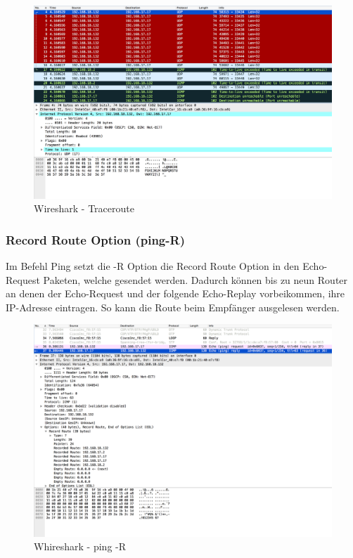 \begin{figure}[htb]
	\centering
  	\includegraphics[scale = 0.27]{pic/tracerouteKnoten}	
  	\caption{Wireshark - Traceroute}
	\label{fig1}
\end{figure}
\newpage
\subsubsection{Record Route Option (ping-R)}
Im Befehl Ping setzt die -R Option die Record Route Option in den Echo-Request Paketen, welche gesendet werden. Dadurch können bis zu neun Router an denen der Echo-Request und der folgende Echo-Replay vorbeikommen, ihre IP-Adresse eintragen. So kann die Route beim Empfänger ausgelesen werden. 
\newline
\newline
\begin{figure}[htb]
	\centering
  	\includegraphics[scale = 0.27]{pic/pingRKnoten}
  	\caption{Whireshark - ping -R}
	\label{fig2}
\end{figure}

